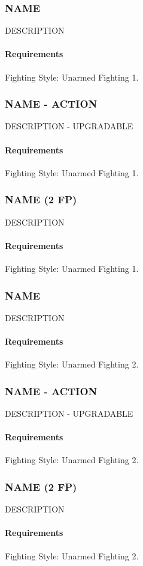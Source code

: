 \subsubsection{NAME} \label{feat::name}
    DESCRIPTION
    \paragraph{Requirements} Fighting Style: Unarmed Fighting 1.
\subsubsection{NAME - ACTION} \label{feat::name}
    DESCRIPTION - UPGRADABLE
    \paragraph{Requirements} Fighting Style: Unarmed Fighting 1.
\subsubsection{NAME (2 FP)} \label{feat::name}
    DESCRIPTION
    \paragraph{Requirements} Fighting Style: Unarmed Fighting 1.
\subsubsection{NAME} \label{feat::name}
    DESCRIPTION
    \paragraph{Requirements} Fighting Style: Unarmed Fighting 2.
\subsubsection{NAME - ACTION} \label{feat::name}
    DESCRIPTION - UPGRADABLE
    \paragraph{Requirements} Fighting Style: Unarmed Fighting 2.
\subsubsection{NAME (2 FP)} \label{feat::name}
    DESCRIPTION
    \paragraph{Requirements} Fighting Style: Unarmed Fighting 2.
